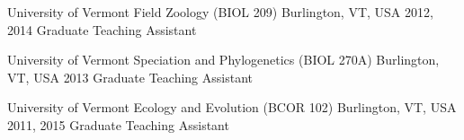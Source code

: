 {\color{awesome}\faChalkboardTeacher}


\begin{cventries}

  \cventry
    {University of Vermont} %
    {Field Zoology (BIOL 209)} %
    {Burlington, VT, USA} %
    {2012, 2014} %
    {Graduate Teaching Assistant}

  \cventry
    {University of Vermont} %
    {Speciation and Phylogenetics (BIOL 270A)} %
    {Burlington, VT, USA} %
    {2013} %
    {Graduate Teaching Assistant}

  \cventry
    {University of Vermont} %
    {Ecology and Evolution (BCOR 102)} %
    {Burlington, VT, USA} %
    {2011, 2015} %
    {Graduate Teaching Assistant}


\end{cventries}
